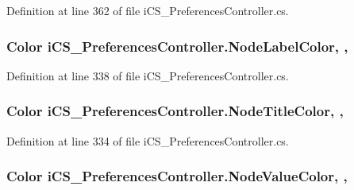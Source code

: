 Definition at line 362 of file i\+C\+S\+\_\+\+Preferences\+Controller.\+cs.

\hypertarget{classi_c_s___preferences_controller_a0408f0ef93511c5cb519773f23ae61ae}{
\subsubsection[{Node\+Label\+Color}]{\setlength{\rightskip}{0pt plus 5cm}Color i\+C\+S\+\_\+\+Preferences\+Controller.\+Node\+Label\+Color\hspace{0.3cm}{\ttfamily [static]}, {\ttfamily [get]}, {\ttfamily [set]}}}\label{classi_c_s___preferences_controller_a0408f0ef93511c5cb519773f23ae61ae}


Definition at line 338 of file i\+C\+S\+\_\+\+Preferences\+Controller.\+cs.

\hypertarget{classi_c_s___preferences_controller_a96787c705cff257d7fe85ca9bb58363d}{
\subsubsection[{Node\+Title\+Color}]{\setlength{\rightskip}{0pt plus 5cm}Color i\+C\+S\+\_\+\+Preferences\+Controller.\+Node\+Title\+Color\hspace{0.3cm}{\ttfamily [static]}, {\ttfamily [get]}, {\ttfamily [set]}}}\label{classi_c_s___preferences_controller_a96787c705cff257d7fe85ca9bb58363d}


Definition at line 334 of file i\+C\+S\+\_\+\+Preferences\+Controller.\+cs.

\hypertarget{classi_c_s___preferences_controller_af2b214ccafaeb6368f27ce9b7227d0f2}{
\subsubsection[{Node\+Value\+Color}]{\setlength{\rightskip}{0pt plus 5cm}Color i\+C\+S\+\_\+\+Preferences\+Controller.\+Node\+Value\+Color\hspace{0.3cm}{\ttfamily [static]}, {\ttfamily [get]}, {\ttfamily [set]}}}\label{classi_c_s___preferences_controller_af2b214ccafaeb6368f27ce9b7227d0f2}


